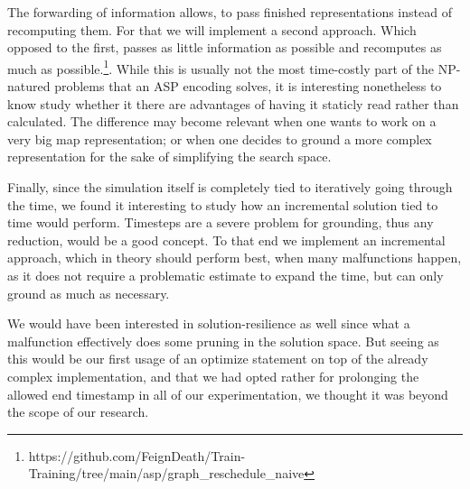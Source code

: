 The forwarding of information allows, to pass finished representations instead of recomputing them. For that we will implement a second approach. Which opposed to the first, passes as little information as possible and recomputes as much as possible.\footnote{https://github.com/FeignDeath/Train-Training/tree/main/asp/graph\_reschedule\_naive}. While this is usually not the most time-costly part of the NP-natured problems that an ASP encoding solves, it is interesting nonetheless to know study whether it there are advantages of having it staticly read rather than calculated. The difference may become relevant when one wants to work on a very big map representation; or when one decides to ground a more complex representation for the sake of simplifying the search space.

Finally, since the simulation itself is completely tied to iteratively going through the time, we found it interesting to study how an incremental solution tied to time would perform. Timesteps are a severe problem for grounding, thus any reduction, would be a good concept. To that end we implement an incremental approach, which in theory should perform best, when many malfunctions happen, as it does not require a problematic estimate to expand the time, but can only ground as much as necessary.

We would have been interested in solution-resilience as well since what a malfunction effectively does some pruning in the solution space. But seeing as this would be our first usage of an optimize statement on top of the already complex implementation, and that we had opted rather for prolonging the allowed end timestamp in all of our experimentation, we thought it was beyond the scope of our research.



